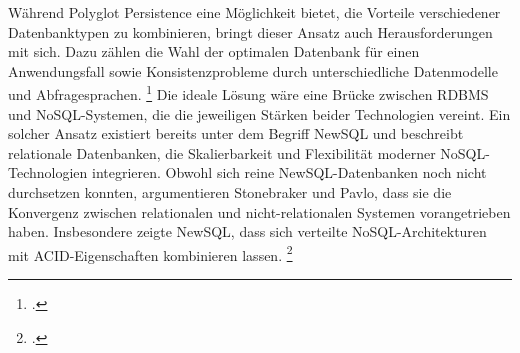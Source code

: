

Während Polyglot Persistence eine Möglichkeit bietet, die Vorteile verschiedener Datenbanktypen zu kombinieren, bringt dieser Ansatz auch Herausforderungen mit sich. Dazu zählen die Wahl der optimalen Datenbank für einen Anwendungsfall sowie Konsistenzprobleme durch unterschiedliche Datenmodelle und Abfragesprachen. \footcite[S. 3 f.]{gessertPolyglotPersistence2015} Die ideale Lösung wäre eine Brücke zwischen RDBMS und NoSQL-Systemen, die die jeweiligen Stärken beider Technologien vereint. Ein solcher Ansatz existiert bereits unter dem Begriff NewSQL und beschreibt relationale Datenbanken, die Skalierbarkeit und Flexibilität moderner NoSQL-Technologien integrieren. Obwohl sich reine NewSQL-Datenbanken noch nicht durchsetzen konnten, argumentieren Stonebraker und Pavlo, dass sie die Konvergenz zwischen relationalen und nicht-relationalen Systemen vorangetrieben haben. Insbesondere zeigte NewSQL, dass sich verteilte NoSQL-Architekturen mit ACID-Eigenschaften kombinieren lassen. \footcite[S. 29 ff.]{stonebrakerWhatGoesComes2024}


